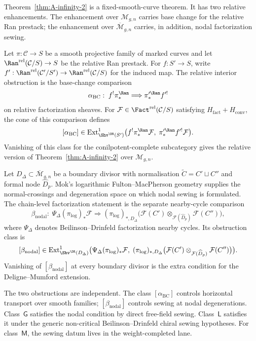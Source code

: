 \begin{remark}
\label{rem:A-infinity-2-modular-family-scope}
Theorem~\ref{thm:A-infinity-2} is a fixed-smooth-curve theorem.  It
has two relative enhancements.  The enhancement over
$\mathcal{M}_{g,n}$ carries base change for the relative Ran prestack;
the enhancement over $\overline{\mathcal{M}}_{g,n}$ carries, in
addition, nodal factorization sewing.

Let $\pi:\mathcal C\to S$ be a smooth projective family of marked
curves and let $\Ran^{\rel}(\mathcal C/S)\to S$ be the relative Ran
prestack. For $f:S'\to S$, write
$f':\Ran^{\rel}(\mathcal C'/S')\to\Ran^{\rel}(\mathcal C/S)$ for the
induced map. The relative interior obstruction is the base-change
comparison
\[
\alpha_{\mathrm{BC}}:\;
f^{!}\pi^{\Ran}_{*}\Longrightarrow \pi'^{\Ran}_{*}f'^{!}
\]
on relative factorization sheaves.  For
$\mathcal F\in\Fact^{\rel}(\mathcal C/S)$ satisfying
$H_{\mathrm{fact}}+H_{\mathrm{conv}}$, the cone of this comparison
defines
\[
[\alpha_{\mathrm{BC}}]\in
\mathrm{Ext}^{1}_{\Shv^{\DR}(S')}
\bigl(f^{!}\pi^{\Ran}_{*}\mathcal F,\;
\pi'^{\Ran}_{*}f'^{!}\mathcal F\bigr).
\]
Vanishing of this class for the conilpotent-complete subcategory gives
the relative version of Theorem~\ref{thm:A-infinity-2} over
$\mathcal M_{g,n}$.

Let $D_\Delta\subset\overline{\mathcal M}_{g,n}$ be a boundary divisor
with normalisation $\widetilde C=C'\sqcup C''$ and formal node
$\widehat D_p$. Mok's logarithmic Fulton--MacPherson geometry
\cite[Theorem~3.3.1, Theorem~5.2.3, Corollary~5.3.4]{Mok25} supplies
the normal-crossings and degeneration space on which nodal sewing is
formulated. The chain-level factorization statement is the separate
nearby-cycle comparison
\[
\beta_{\mathrm{nodal}}:\;
\Psi_\Delta(\pi_{\log})_{*}\mathcal F
\Longrightarrow
(\pi_{\log})_{*,D_\Delta}
\bigl(\mathcal F(C')\otimes_{\mathcal F(\widehat D_p)}
\mathcal F(C'')\bigr),
\]
where $\Psi_\Delta$ denotes Beilinson--Drinfeld factorization nearby
cycles. Its obstruction class is
\[
[\beta_{\mathrm{nodal}}]\in
\mathrm{Ext}^{1}_{\Shv^{\DR}(D_\Delta)}
\bigl(\Psi_\Delta(\pi_{\log})_{*}\mathcal F,\;
(\pi_{\log})_{*,D_\Delta}
\bigl(\mathcal F(C')\otimes_{\mathcal F(\widehat D_p)}
\mathcal F(C'')\bigr)\bigr).
\]
Vanishing of $[\beta_{\mathrm{nodal}}]$ at every boundary divisor is
the extra condition for the Deligne--Mumford extension.

The two obstructions are independent. The class
$[\alpha_{\mathrm{BC}}]$ controls horizontal transport over smooth
families; $[\beta_{\mathrm{nodal}}]$ controls sewing at nodal
degenerations. Class~$\mathsf G$ satisfies the nodal condition by
direct free-field sewing. Class~$\mathsf L$ satisfies it under the
generic non-critical Beilinson--Drinfeld chiral sewing hypotheses.
For class~$\mathsf M$, the sewing datum lives in the weight-completed
lane.


\end{remark}

